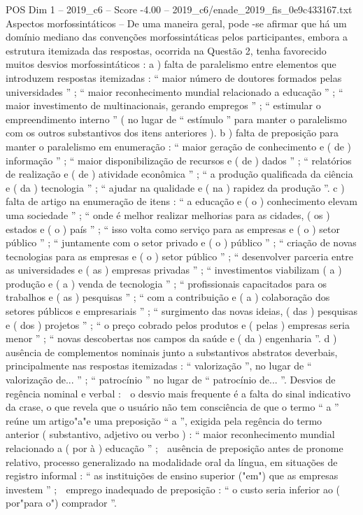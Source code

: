 \begin{textsample}{POS Dim 1 – 2019\_c6 – Score -4.00 – 2019\_c6/enade\_2019\_fis\_0e9c433167.txt}
Aspectos morfossintáticos – De uma maneira geral, pode -se afirmar que há um domínio mediano das convenções morfossintáticas pelos participantes, embora a estrutura itemizada das respostas, ocorrida na Questão 2, tenha favorecido muitos desvios morfossintáticos : a ) falta de paralelismo entre elementos que introduzem respostas itemizadas : “ maior número de doutores formados pelas universidades ” ; “ maior reconhecimento mundial relacionado a educação ” ; “ maior investimento de multinacionais, gerando empregos ” ; “ estimular o empreendimento interno ” ( no lugar de “ estímulo ” para manter o paralelismo com os outros substantivos dos itens anteriores ). b ) falta de preposição para manter o paralelismo em enumeração : “ maior geração de conhecimento e ( de ) informação ” ; “ maior disponibilização de recursos e ( de ) dados ” ; “ relatórios de realização e ( de ) atividade econômica ” ; “ a produção qualificada da ciência e ( da ) tecnologia ” ; “ ajudar na qualidade e ( na ) rapidez da produção ”. c ) falta de artigo na enumeração de itens : “ a educação e ( o ) conhecimento elevam uma sociedade ” ; “ onde é melhor realizar melhorias para as cidades, ( os ) estados e ( o ) país ” ; “ isso volta como serviço para as empresas e ( o ) setor público ” ; “ juntamente com o setor privado e ( o ) público ” ; “ criação de novas tecnologias para as empresas e ( o ) setor público ” ; “ desenvolver parceria entre as universidades e ( as ) empresas privadas ” ; “ investimentos viabilizam ( a ) produção e ( a ) venda de tecnologia ” ; “ profissionais capacitados para os trabalhos e ( as ) pesquisas ” ; “ com a contribuição e ( a ) colaboração dos setores públicos e empresariais ” ; “ surgimento das novas ideias, ( das ) pesquisas e ( dos ) projetos ” ; “ o preço cobrado pelos produtos e ( pelas ) empresas seria menor ” ; “ novas descobertas nos campos da saúde e ( da ) engenharia ”. d ) ausência de complementos nominais junto a substantivos abstratos deverbais, principalmente nas respostas itemizadas : “ valorização ”, no lugar de “ valorização de... ” ; “ patrocínio ” no lugar de “ patrocínio de... ”.
Desvios de regência nominal e verbal :  o desvio mais frequente é a falta do sinal indicativo da crase, o que revela que o usuário não tem consciência de que o termo “ a ” reúne um artigo"a"e uma preposição “ a ”, exigida pela regência do termo anterior ( substantivo, adjetivo ou verbo ) : “ maior reconhecimento mundial relacionado a ( por à ) educação ” ;  ausência de preposição antes de pronome relativo, processo generalizado na modalidade oral da língua, em situações de registro informal : “ as instituições de ensino superior ("em") que as empresas investem ” ;  emprego inadequado de preposição : “ o custo seria inferior ao ( por"para o") comprador ”.

\end{textsample}
